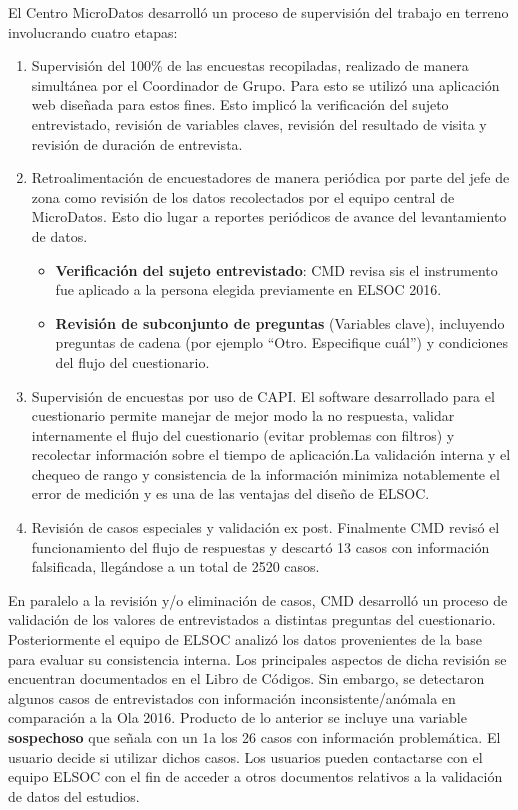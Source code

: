 \documentclass[12pt]{report}
\begin{document}
El Centro MicroDatos desarrolló un proceso de supervisión del trabajo en terreno involucrando cuatro etapas:
\begin{enumerate}
	\item Supervisión del 100\% de las encuestas recopiladas,  realizado de manera simultánea por el Coordinador de Grupo. Para esto se utilizó una aplicación web diseñada para estos fines. Esto implicó la verificación del sujeto entrevistado, revisión de variables claves, revisión del resultado de visita y revisión de duración de entrevista. 
	\item Retroalimentación de encuestadores de manera periódica por parte del jefe de zona como revisión de los datos recolectados por el equipo central de MicroDatos. Esto dio lugar a reportes periódicos de avance del levantamiento de datos. 
	\begin{itemize}
	 	\item \textbf{Verificación del sujeto entrevistado}: CMD revisa sis el instrumento fue aplicado a la persona elegida previamente en ELSOC 2016. 
		\item \textbf{Revisión de subconjunto de preguntas} (Variables clave), incluyendo preguntas de cadena (por ejemplo ``Otro. Especifique cuál'') y condiciones del flujo del cuestionario.
	\end{itemize}
	\item Supervisión de encuestas por uso de CAPI. El software desarrollado para el cuestionario permite manejar de mejor modo la no respuesta, validar internamente el flujo del cuestionario (evitar problemas con filtros) y recolectar información sobre el tiempo de aplicación.La validación interna y el chequeo de rango y consistencia de la información minimiza notablemente el error de medición y es una de las ventajas del diseño de ELSOC. 
	\item Revisión de casos especiales y validación ex post. Finalmente CMD revisó el funcionamiento del flujo de respuestas y descartó 13 casos con información falsificada, llegándose a un total de 2520 casos. 
\end{enumerate}

En paralelo a la revisión y/o eliminación de casos, CMD desarrolló un proceso de validación de los valores de entrevistados a distintas preguntas  del cuestionario. Posteriormente el equipo de ELSOC analizó los datos provenientes de la base para evaluar su consistencia interna. Los principales aspectos de dicha revisión se encuentran documentados en el Libro de Códigos. Sin embargo, se detectaron algunos casos de entrevistados con información inconsistente/anómala en comparación a la Ola 2016. Producto de lo anterior se incluye una variable \textbf{sospechoso} que señala con un 1a  los 26 casos con información problemática. El usuario decide si utilizar dichos casos. Los usuarios pueden contactarse con el equipo ELSOC con el fin de acceder a otros documentos relativos a la validación de datos del estudios.\\
\end{document}

